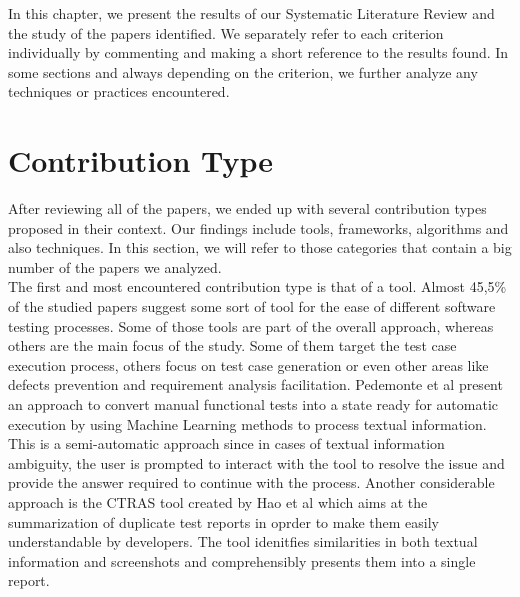 In this chapter, we present the results of our Systematic Literature Review and the study of the papers identified. We separately refer to 
each criterion individually by commenting and making a short reference to the results found. In some sections and always depending on the criterion, we further analyze any 
techniques or practices encountered. 

\section {Contribution Type}
After reviewing all of the papers, we ended up with several contribution types proposed in their context. Our findings include tools, frameworks, algorithms and also techniques. 
In this section, we will refer to those categories that contain a big number of the papers we analyzed.\\

The first and most encountered contribution type is that of a tool. Almost 45,5\% of the studied papers suggest some sort of tool for the ease of different software testing processes. 
Some of those tools are part of the overall approach, whereas others are the main focus of the study. Some of them target the test case execution process, others focus on test case 
generation or even other areas like defects prevention and requirement analysis facilitation. Pedemonte et al \cite{pedemonte2012towards} present an approach to convert manual 
functional tests into a state ready for automatic execution by using Machine Learning methods to process textual information. This is a semi-automatic approach since in cases 
of textual information ambiguity, the user is prompted to interact with the tool to resolve the issue and provide the answer required to continue with the process. Another 
considerable approach is the CTRAS tool created by Hao et al \cite{8811987} which aims at the summarization of duplicate test reports in oprder to make them easily understandable 
by developers. The tool idenitfies similarities in both textual information and screenshots and comprehensibly presents them into a single report. \\

